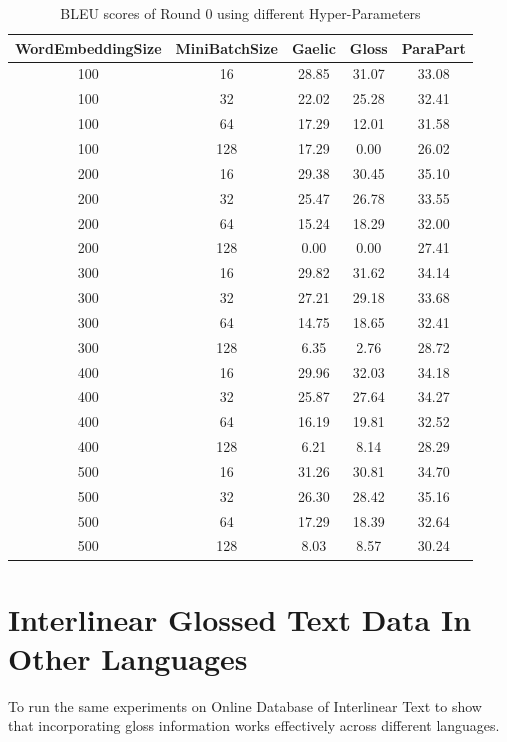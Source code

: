 \documentclass[final]{ua-thesis}
\numberwithin{equation}{section}
\begin{document}
\begin{table}[ht]
\centering
\begin{tabular}{ccccc}
  \hline
WordEmbeddingSize & MiniBatchSize & Gaelic & Gloss & ParaPart \\ 
  \hline
100 &  16 & 28.85 & 31.07 & 33.08 \\ 
  100 &  32 & 22.02 & 25.28 & 32.41 \\ 
  100 &  64 & 17.29 & 12.01 & 31.58 \\ 
  100 & 128 & 17.29 & 0.00 & 26.02 \\ 
  200 &  16 & 29.38 & 30.45 & 35.10 \\ 
  200 &  32 & 25.47 & 26.78 & 33.55 \\ 
  200 &  64 & 15.24 & 18.29 & 32.00 \\ 
  200 & 128 & 0.00 & 0.00 & 27.41 \\ 
  300 &  16 & 29.82 & 31.62 & 34.14 \\ 
  300 &  32 & 27.21 & 29.18 & 33.68 \\ 
  300 &  64 & 14.75 & 18.65 & 32.41 \\ 
  300 & 128 & 6.35 & 2.76 & 28.72 \\ 
  400 &  16 & 29.96 & 32.03 & 34.18 \\ 
  400 &  32 & 25.87 & 27.64 & 34.27 \\ 
  400 &  64 & 16.19 & 19.81 & 32.52 \\ 
  400 & 128 & 6.21 & 8.14 & 28.29 \\ 
  500 &  16 & 31.26 & 30.81 & 34.70 \\ 
  500 &  32 & 26.30 & 28.42 & 35.16 \\ 
  500 &  64 & 17.29 & 18.39 & 32.64 \\ 
  500 & 128 & 8.03 & 8.57 & 30.24 \\ 
   \hline
\end{tabular}
\caption{BLEU scores of Round 0 using different Hyper-Parameters} 
\label{Table:HyPara}
\end{table}
\section{Interlinear Glossed Text Data In Other Languages}
To run the same experiments on Online Database of Interlinear Text \citep{ODIN, Xia2016} to show that incorporating gloss information works effectively across different languages.  
\end{document}
